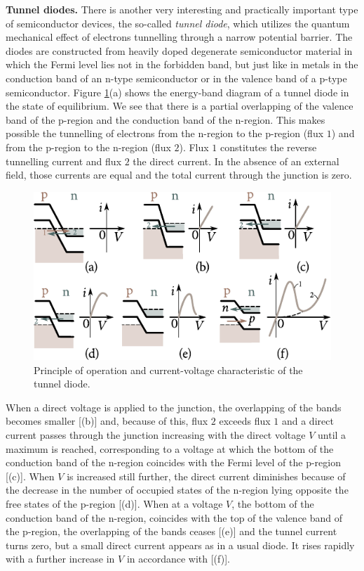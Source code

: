 \textbf{Tunnel diodes.} There is another very interesting and practically important type of semiconductor devices, the so-called \textit{tunnel diode}, which utilizes the quantum mechanical effect of electrons tunnelling through a narrow potential barrier. The diodes are constructed from heavily doped degenerate semiconductor material in which the Fermi level lies not in the forbidden band, but just like in metals in the conduction band of an n-type semiconductor or in the valence band of a p-type semiconductor. Figure \ref{fig:8_21}(a) shows the energy-band diagram of a tunnel diode in the state of equilibrium. We see that there is a partial overlapping of the valence band of the p-region and the conduction band of the n-region. This makes possible the tunnelling of electrons from the n-region to the p-region (flux $1$) and from the p-region to the n-region (flux $2$). Flux $1$ constitutes the reverse tunnelling current and flux $2$ the direct current. In the absence of an external field, those currents are equal and the total current through the junction is zero.

\begin{figure}[t]
	\begin{center}
		\includegraphics[scale=1.1]{figures/ch_08/fig_8_21.pdf}
		\caption[]{Principle of operation and current-voltage characteristic of the tunnel diode.}
		\label{fig:8_21}
	\end{center}
	\vspace{-0.8cm}
\end{figure}

When a direct voltage is applied to the junction, the overlapping of the bands becomes smaller [(b)] and, because of this, flux $2$ exceeds flux $1$ and a direct current passes through the junction increasing with the direct voltage $V$ until a maximum is reached, corresponding to a voltage at which the bottom of the conduction band of the n-region coincides with the Fermi level of the p-region [(c)]. When $V$ is increased still further, the direct current diminishes because of the decrease in the number of occupied states of the n-region lying opposite the free states of the p-region [(d)]. When at a voltage $V$, the bottom of the conduction band of the n-region, coincides with the top of the valence band of the p-region, the overlapping of the bands ceases [(e)] and the tunnel current turns zero, but a small direct current appears as in a usual diode. It rises rapidly with a further increase in $V$ in accordance with  [(f)].

